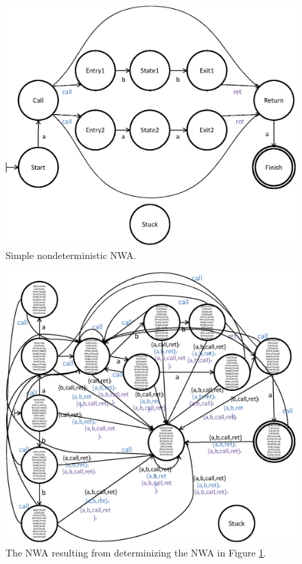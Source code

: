 \documentclass{llncs}
\begin{document}
\begin{figure}[htbp]
  \centering
    \includegraphics[width=12cm]{Figures/Figure16.eps}
  \caption{Simple nondeterministic NWA.}
  \label{Fig:Det1}
\end{figure}


\begin{figure}[htbp]
  \centering
    \includegraphics[width=16cm]{Figures/Figure17.eps}
  \caption{The NWA resulting from determinizing the NWA in Figure \ref{Fig:Det1}.}
  \label{Fig:Det2}
\end{figure}
\end{document}
